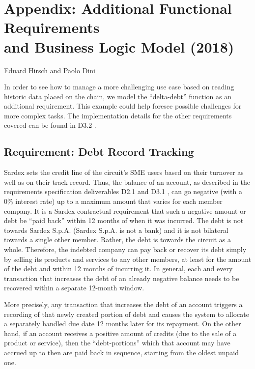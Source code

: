 \chapter*{Appendix: Additional Functional Requirements\\ and Business Logic Model (2018)}
\label{appendix}

\vspace{-1cm}
\begin{center}
Eduard Hirsch and Paolo Dini
\end{center}

In order to see how to manage a more challenging use case based on reading historic data placed on the chain, we model the ``delta-debt'' function as an additional requirement. This example could help foresee possible challenges for more complex tasks. The implementation details for the other requirements covered can be found in D3.2 \cite{INTERLACE_D32}.

\section{Requirement: Debt Record Tracking}

Sardex sets the credit line of the circuit's SME users based on their turnover as well as on their track record. Thus, the balance of an account, as described in the requirements specification deliverables D2.1 and D3.1 \cite{INTERLACE_D21,INTERLACE_D31}, can go negative (with a 0\% interest rate) up to a maximum amount that varies for each member company. It is a Sardex contractual requirement that such a negative amount or debt be ``paid back'' within 12 months of when it was incurred. The debt is not towards Sardex S.p.A. (Sardex S.p.A. is not a bank) and it is not bilateral towards a single other member. Rather, the debt is towards the circuit as a whole. Therefore, the indebted company can pay back or recover its debt simply by selling its products and services to any other members, at least for the amount of the debt and within 12 months of incurring it. In general, each and every transaction that increases the debt of an already negative balance needs to be recovered within a separate 12-month window.

More precisely, any transaction that increases the debt of an account triggers a recording of that newly created portion of debt and causes the system to allocate a separately handled due date 12 months later for its repayment. On the other hand, if an account receives a positive amount of credits (due to the sale of a product or service), then the ``debt-portions'' which that account may have accrued up to then are paid back in sequence, starting from the oldest unpaid one.

